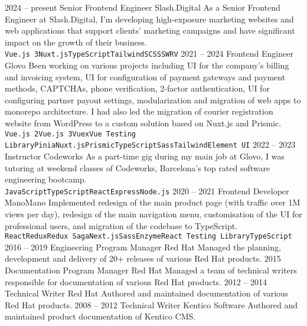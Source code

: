 \documentclass[9pt]{developercv}
\begin{document}
\begin{entrylist}
  \entry
  {2024 --  present}
  {Senior Frontend Engineer}
  {Slash.Digital}
  {As a Senior Frontend Engineer at Slash.Digital, I'm developing high-exposure marketing websites and web applications that support clients' marketing campaigns and have significant impact on the growth of their business.\\ \texttt{Vue.js 3}\slashsep\texttt{Nuxt.js}\slashsep\texttt{TypeScript}\slashsep\texttt{Tailwind}\slashsep\texttt{SCSS}\slashsep\texttt{SWRV}}
  \entry
  {2021 --  2024}
  {Frontend Engineer}
  {Glovo}
  {Been working on various projects including UI for the company's billing and invoicing system, UI for configuration of payment gateways and payment methods, CAPTCHAs, phone verification, 2-factor authentication, UI for configuring partner payout settings, modularization and migration of web apps to monorepo architecture. I had also led the migration of courier registration website from WordPress to a custom solution based on Nuxt.js and Prismic.\\ \texttt{Vue.js 2}\slashsep\texttt{Vue.js 3}\slashsep\texttt{Vuex}\slashsep\texttt{Vue Testing Library}\slashsep\texttt{Pinia}\slashsep\texttt{Nuxt.js}\slashsep\texttt{Prismic}\slashsep\texttt{TypeScript}\slashsep\texttt{Sass}\slashsep\texttt{Tailwind}\slashsep\texttt{Element UI}}
  \entry
  {2022 --  2023}
  {Instructor}
  {Codeworks}
  {As a part-time gig during my main job at Glovo, I was tutoring at weekend classes of Codeworks, Barcelona’s top rated software engineering bootcamp.\\ \texttt{JavaScript}\slashsep\texttt{TypeScript}\slashsep\texttt{React}\slashsep\texttt{Express}\slashsep\texttt{Node.js}}
  \entry
  {2020 -- 2021}
  {Frontend Developer}
  {ManoMano}
  {Implemented redesign of the main product page (with traffic over 1M views per day), redesign of the main navigation menu, customisation of the UI for professional users, and migration of the codebase to TypeScript.\\ \texttt{React}\slashsep\texttt{Redux}\slashsep\texttt{Redux Saga}\slashsep\texttt{Next.js}\slashsep\texttt{Sass}\slashsep\texttt{Enzyme}\slashsep\texttt{React Testing Library}\slashsep\texttt{TypeScript}}
  \entry
  {2016 -- 2019}
  {Engineering Program Manager}
  {Red Hat}
  {Managed the planning, development and delivery of 20+ releases of various Red Hat products. }
  \entry
  {2015}
  {Documentation Program Manager}
  {Red Hat}
  {Managed a team of technical writers responsible for documentation of various Red Hat products. }
  \entry
  {2012 -- 2014}
  {Technical Writer}
  {Red Hat}
  {Authored and maintained documentation of various Red Hat products. }
  \entry
  {2008 -- 2012}
  {Technical Writer}
  {Kentico Software}
  {Authored and maintained product documentation of Kentico CMS. }
\end{entrylist}
\end{document}
